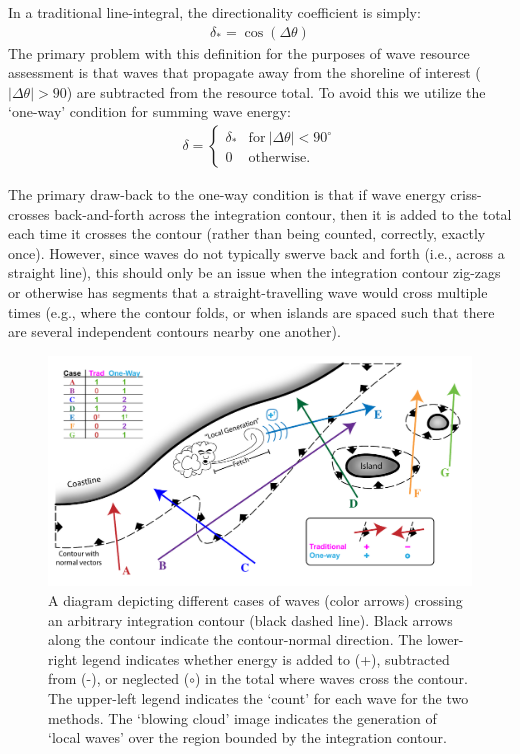 In a traditional line-integral, the directionality coefficient is simply:
\begin{align}
    \delta_{*} = \cos(\Delta \theta)
    \label{eqn:trad-def}
\end{align}
The primary problem with this definition for the purposes of wave resource assessment is that waves that propagate away from the shoreline of interest ($|\Delta \theta | > 90$) are subtracted from the resource total. To avoid this we utilize the `one-way' condition for summing wave energy:
\begin{align}
    \delta = 
    \begin{cases}
     \delta_* & \mathrm{for\ }|\Delta \theta|<90^\circ \\
    0 & \mathrm{otherwise}.
    \end{cases}
    \label{eqn:1way-def}
\end{align}

The primary draw-back to the one-way condition is that if wave energy criss-crosses back-and-forth across the integration contour, then it is added to the total each time it crosses the contour (rather than being counted, correctly, exactly once). However, since waves do not typically swerve back and forth (i.e., across a straight line), this should only be an issue when the integration contour zig-zags or otherwise has segments that a straight-travelling wave would cross multiple times (e.g., where the contour folds, or when islands are spaced such that there are several independent contours nearby one another).

\begin{figure}[ht]
    \centering
    \includegraphics[width=\linewidth]{../../diagram/Schematic03.pdf}
    \caption{A diagram depicting different cases of waves (color arrows) crossing an arbitrary integration contour (black dashed line). Black arrows along the contour indicate the contour-normal direction. The lower-right legend indicates whether energy is added to (+), subtracted from (-), or neglected ($\circ$) in the total where waves cross the contour. The upper-left legend indicates the `count' for each wave for the two methods. The `blowing cloud' image indicates the generation of `local waves' over the region bounded by the integration contour.}
    \label{fig:one-way-diagram}
\end{figure}

